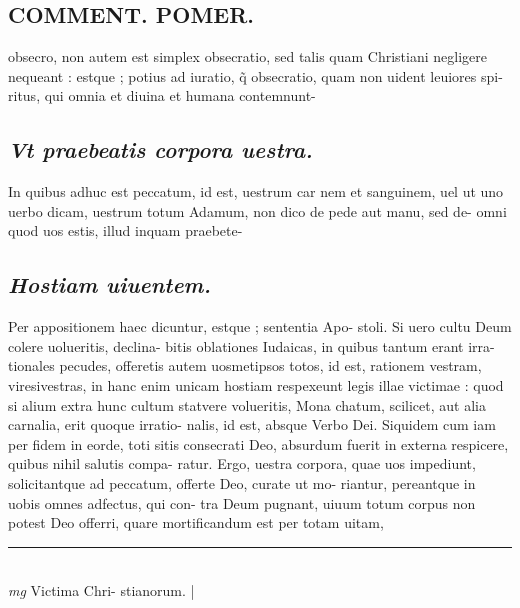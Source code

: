 \documentclass{article}
\begin{document}
\begin{pages}
\section*{COMMENT. POMER.  }\pstart obsecro, non autem est simplex obsecratio, sed talis quam Christiani negligere nequeant : estque ; potius ad iuratio, q̃ obsecratio, quam non uident leuiores spi- ritus, qui omnia et diuina et humana contemnunt-  \pend
{}
{}
\subsection*{\textit{Vt praebeatis corpora uestra. }}\pstart In quibus adhuc est peccatum, id est, uestrum car nem et sanguinem, uel ut uno uerbo dicam, uestrum totum Adamum, non dico de pede aut manu, sed de- omni quod uos estis, illud inquam praebete-  \pend
{}
{}
\subsection*{\textit{Hostiam uiuentem. }}\pstart Per appositionem haec dicuntur, estque ; sententia Apo- stoli. Si uero cultu Deum colere uolueritis, declina- bitis oblationes Iudaicas, in quibus tantum erant irra- tionales pecudes, offeretis autem uosmetipsos totos, id est, rationem vestram, viresivestras, in hanc enim unicam hostiam respexeunt legis illae victimae : quod si alium extra hunc cultum statvere volueritis, Mona chatum, scilicet, aut alia carnalia, erit quoque irratio- nalis, id est, absque Verbo Dei. Siquidem cum iam per fidem in eorde, toti sitis consecrati Deo, absurdum fuerit in externa respicere, quibus nihil salutis compa- ratur. Ergo, uestra corpora, quae uos impediunt, solicitantque ad peccatum, offerte Deo, curate ut mo- riantur, pereantque in uobis omnes adfectus, qui con- tra Deum pugnant, uiuum totum corpus non potest Deo offerri, quare mortificandum est per totam uitam,  \pend
\vspace{0.5cm}\noindent
\vspace{0.2cm}\rule{1cm}{0.2pt}\\ 
\hspace{0.2cm}\textit{mg}
\footnotesize Victima Chri- stianorum.  
\normalsize| 

\end{pages}
\end{document}
